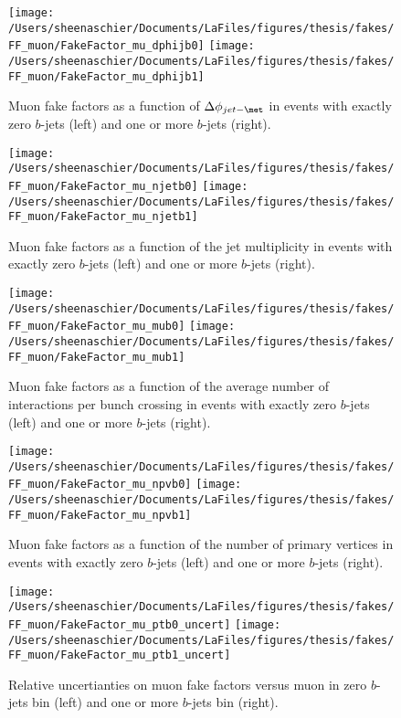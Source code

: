 \begin{figure}[tbp]
  \centering
  \texttt{[image: /Users/sheenaschier/Documents/LaFiles/figures/thesis/fakes/FF\_muon/FakeFactor\_mu\_dphijb0]}
  \texttt{[image: /Users/sheenaschier/Documents/LaFiles/figures/thesis/fakes/FF\_muon/FakeFactor\_mu\_dphijb1]}
  \caption{Muon fake factors as a function of $\Delta\phi_{jet-\met}$ in events with exactly zero $b$-jets (left) and one or more $b$-jets (right).}
  \label{fig:muon_FF_dphij1}
\end{figure}

\begin{figure}[tbp]
  \centering
  \texttt{[image: /Users/sheenaschier/Documents/LaFiles/figures/thesis/fakes/FF\_muon/FakeFactor\_mu\_njetb0]}
  \texttt{[image: /Users/sheenaschier/Documents/LaFiles/figures/thesis/fakes/FF\_muon/FakeFactor\_mu\_njetb1]}\\
  \caption{Muon fake factors as a function of the jet multiplicity in events with exactly zero $b$-jets (left) and one or more $b$-jets (right).}
  \label{fig:muon_FF_njet}
\end{figure}

\begin{figure}[tbp]
  \centering
  \texttt{[image: /Users/sheenaschier/Documents/LaFiles/figures/thesis/fakes/FF\_muon/FakeFactor\_mu\_mub0]}
  \texttt{[image: /Users/sheenaschier/Documents/LaFiles/figures/thesis/fakes/FF\_muon/FakeFactor\_mu\_mub1]}\\
  \caption{Muon fake factors as a function of the average number of interactions per bunch crossing in events with exactly zero $b$-jets (left) and one or more $b$-jets (right).}
  \label{fig:muon_FF_mu}
\end{figure}

\begin{figure}[tbp]
  \centering
  \texttt{[image: /Users/sheenaschier/Documents/LaFiles/figures/thesis/fakes/FF\_muon/FakeFactor\_mu\_npvb0]}
  \texttt{[image: /Users/sheenaschier/Documents/LaFiles/figures/thesis/fakes/FF\_muon/FakeFactor\_mu\_npvb1]}\\
  \caption{Muon fake factors as a function of the number of primary vertices in events with exactly zero $b$-jets (left) and one or more $b$-jets (right).}
  \label{fig:muon_FF_npv}
\end{figure}

\begin{figure}[tbp]
  \centering
  \texttt{[image: /Users/sheenaschier/Documents/LaFiles/figures/thesis/fakes/FF\_muon/FakeFactor\_mu\_ptb0\_uncert]}
  \texttt{[image: /Users/sheenaschier/Documents/LaFiles/figures/thesis/fakes/FF\_muon/FakeFactor\_mu\_ptb1\_uncert]}\\
  \caption{Relative uncertianties on muon fake factors versus muon \pt{} in zero $b$-jets bin (left) and one or more $b$-jets bin (right).}
  \label{fig:muon_FF_rel_uncert}
\end{figure}

